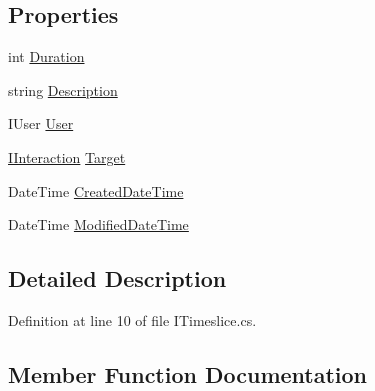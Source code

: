 \subsection*{Properties}
\begin{DoxyCompactItemize}
\item 
int \hyperlink{interface_plex_byte_1_1_mo_cap_1_1_interactions_1_1_i_timeslice_ae5913fb8d9d7a5b4de9b9b9a4acd94be}{Duration}
\item 
string \hyperlink{interface_plex_byte_1_1_mo_cap_1_1_interactions_1_1_i_timeslice_ad37b8578c03d8e90956a670b9a70bcbd}{Description}
\item 
I\+User \hyperlink{interface_plex_byte_1_1_mo_cap_1_1_interactions_1_1_i_timeslice_a719ec23a47825e45f4106f1c50a08804}{User}
\item 
\hyperlink{interface_plex_byte_1_1_mo_cap_1_1_interactions_1_1_i_interaction}{I\+Interaction} \hyperlink{interface_plex_byte_1_1_mo_cap_1_1_interactions_1_1_i_timeslice_a1b70f9e866de9e39c2de1bc4db02d629}{Target}
\item 
Date\+Time \hyperlink{interface_plex_byte_1_1_mo_cap_1_1_interactions_1_1_i_timeslice_ae32d625997888202222bc31e4d8e1f17}{Created\+Date\+Time}
\item 
Date\+Time \hyperlink{interface_plex_byte_1_1_mo_cap_1_1_interactions_1_1_i_timeslice_adebf67921d263827545fa2f8f97d3b50}{Modified\+Date\+Time}
\end{DoxyCompactItemize}


\subsection{Detailed Description}


Definition at line 10 of file I\+Timeslice.\+cs.



\subsection{Member Function Documentation}
